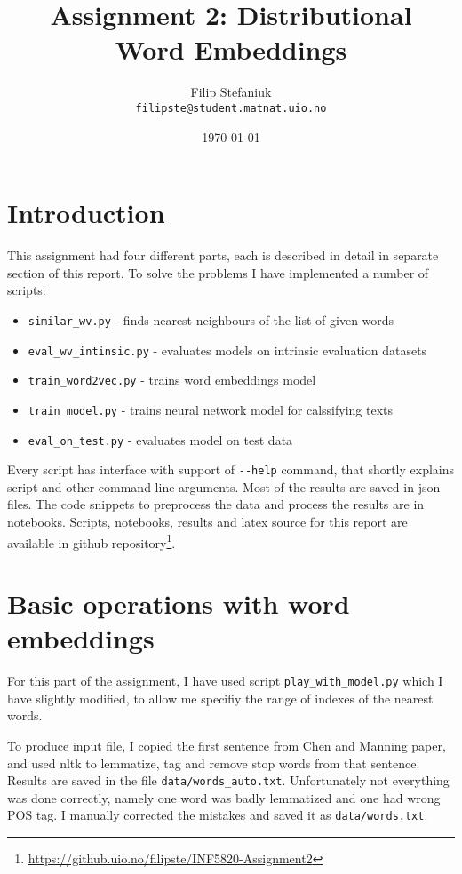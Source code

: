 \documentclass{article}
\title{Assignment 2: Distributional\\ Word Embeddings} %
\author{Filip Stefaniuk\\ \texttt{filipste@student.matnat.uio.no}} %
\date{\today} %
\begin{document}
\maketitle %

\section*{Introduction}
This assignment had four different parts, each is described in detail in separate section of this report.
To solve the problems I have implemented a number of scripts:
\begin{itemize}
	\item \lstinline{similar_wv.py} - finds nearest neighbours of the list of given words
	\item \lstinline{eval_wv_intinsic.py} - evaluates models on intrinsic evaluation datasets
	\item \lstinline{train_word2vec.py} - trains word embeddings model
	\item \lstinline{train_model.py} - trains neural network model for calssifying texts
	\item \lstinline{eval_on_test.py} - evaluates model on test data
\end{itemize}
Every script has interface with support of \lstinline{--help} command, that shortly explains script and
other command line arguments. Most of the results are saved in json files. The code snippets to
preprocess the data and process the results are in notebooks. Scripts, notebooks, results and
latex source for this report are available in github repository\footnote{\href{https://github.uio.no/filipste/INF5820-Assignment2}{https://github.uio.no/filipste/INF5820-Assignment2}}.
\section{Basic operations with word embeddings}

For this part of the assignment, I have used script \lstinline{play_with_model.py} which I
have slightly modified, to allow me specifiy the range of indexes of the nearest words.

To produce input file, I copied the first sentence from Chen and Manning paper, and used
nltk to lemmatize, tag and remove stop words from that sentence. Results are saved in the file
\lstinline{data/words_auto.txt}. Unfortunately not everything was done correctly, namely one
word was badly lemmatized and one had wrong POS tag. I manually
corrected the mistakes and saved it as \lstinline{data/words.txt}.
\end{document}
